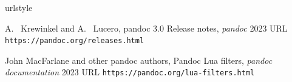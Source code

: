\begin{thebibliography}{2}
    \providecommand{\natexlab}[1]{#1}
    \providecommand{\url}[1]{\texttt{#1}}
    \expandafter\ifx\csname urlstyle\endcsname\relax
      \providecommand{\doi}[1]{doi: #1}\else
      \providecommand{\doi}{doi: \begingroup \urlstyle{rm}\Url}\fi

A.~ Krewinkel and A.~ Lucero,
\newblock pandoc 3.0 Release notes,
\newblock \emph{pandoc}  2023
\newblock URL \url{https://pandoc.org/releases.html}

John MacFarlane and other pandoc authors,
\newblock Pandoc Lua filters,
\newblock \emph{pandoc documentation}  2023
\newblock URL \url{https://pandoc.org/lua-filters.html}

\end{thebibliography}


\address{%
Abhishek Ulayil\\
Student, Institute of Actuaries of India\\%
Mumbai, India\\
ORCiD: 0009-0000-6935-8690\\
}

